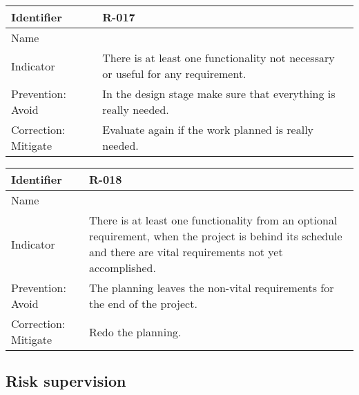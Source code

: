 \begin{table}[H]
	\begin{tabularx}{\textwidth}{|y|z|}
		\hline
		Identifier & \textbf{R-017} \\ \hline
		Name & \Rdiecisiete \\ \hline
		Indicator & There is at least one functionality not necessary or useful for any requirement.\\ \hline
		Prevention: Avoid & In the design stage make sure that everything is really needed.\\ \hline
		Correction: Mitigate & Evaluate again if the work planned is really needed.\\ \hline
	\end{tabularx}
\end{table}

\begin{table}[H]
	\begin{tabularx}{\textwidth}{|y|z|}
		\hline
		Identifier & \textbf{R-018} \\ \hline
		Name & \Rdieciocho \\ \hline
		Indicator & There is at least one functionality from an optional requirement, when the project is behind its schedule and there are vital requirements not yet accomplished.\\ \hline
		Prevention: Avoid & The planning leaves the non-vital requirements for the end of the project.\\ \hline
		Correction: Mitigate & Redo the planning.\\ \hline
	\end{tabularx}
\end{table}



\subsection{Risk supervision}


